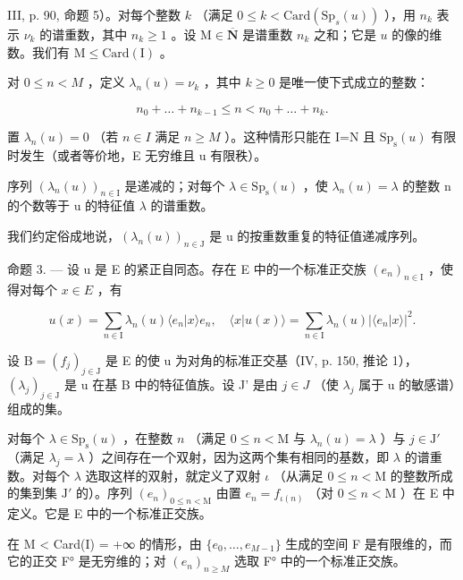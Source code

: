 III, p. 90, 命题 5）。对每个整数 \(k\) （满足 \(0 \leqslant k < \text{Card}(\text{Sp}_s(u))\) ），用 \(n_k\) 表示 \(\nu_k\) 的谱重数，其中 \(n_k \geqslant 1\) 。设 \(\text{M} \in \overline{\mathbf{N}}\) 是谱重数 \(n_k\) 之和；它是 \(u\) 的像的维数。我们有 \(\text{M} \leqslant \text{Card}(\text{I})\) 。

对 \(0 \leqslant n < M\) ，定义 \(\lambda_n(u) = \nu_k\) ，其中 \(k \geqslant 0\) 是唯一使下式成立的整数：

\[
n _ {0} + \dots + n _ {k - 1} \leqslant n <   n _ {0} + \dots + n _ {k}.
\]

置 \(\lambda_{n}(u)=0\) （若 \(n\in I\) 满足 \(n\geqslant M\) ）。这种情形只能在 I=N 且 \(\mathrm{Sp}_{\mathrm{s}}(u)\) 有限时发生（或者等价地，E 无穷维且 u 有限秩）。

序列 \((\lambda_{n}(u))_{n\in\mathrm{I}}\) 是递减的；对每个 \(\lambda\in\mathrm{Sp}_{\mathrm{s}}(u)\) ，使 \(\lambda_{n}(u)=\lambda\) 的整数 n 的个数等于 u 的特征值 \(\lambda\) 的谱重数。

我们约定俗成地说，\((\lambda_{n}(u))_{n\in\mathrm{J}}\) 是 u 的按重数重复的特征值递减序列。

命题 3. --- 设 u 是 E 的紧正自同态。存在 E 中的一个标准正交族 \((e_{n})_{n\in\mathrm{I}}\) ，使得对每个 \(x\in E\) ，有

\[
u (x) = \sum_ {n \in \mathrm{I}} \lambda_ {n} (u) \langle e _ {n} | x \rangle e _ {n}, \quad \langle x | u (x) \rangle = \sum_ {n \in \mathrm{I}} \lambda_ {n} (u) | \langle e _ {n} | x \rangle | ^ {2}.
\]

设 \(\mathrm{B} = (f_{j})_{j \in \mathrm{J}}\) 是 E 的使 u 为对角的标准正交基（IV, p. 150, 推论 1），\((\lambda_{j})_{j \in \mathrm{J}}\) 是 u 在基 B 中的特征值族。设 J' 是由 \(j \in J\) （使 \(\lambda_{j}\) 属于 u 的敏感谱）组成的集。

对每个 \(\lambda \in \mathrm{Sp}_{\mathrm{s}}(u)\) ，在整数 \(n\) （满足 \(0 \leqslant n < \mathrm{M}\) 与 \(\lambda_{n}(u) = \lambda\) ）与 \(j \in \mathrm{J}'\) （满足 \(\lambda_{j} = \lambda\) ）之间存在一个双射，因为这两个集有相同的基数，即 \(\lambda\) 的谱重数。对每个 \(\lambda\) 选取这样的双射，就定义了双射 \(\iota\) （从满足 \(0 \leqslant n < \mathrm{M}\) 的整数所成的集到集 \(\mathrm{J}'\) 的）。序列 \((e_n)_{0 \leqslant n < \mathrm{M}}\) 由置 \(e_n = f_{\iota(n)}\) （对 \(0 \leqslant n < \mathrm{M}\) ）在 E 中定义。它是 E 中的一个标准正交族。

在 M \textless{} Card(I) = +∞ 的情形，由 \(\{e_{0},\ldots,e_{M-1}\}\) 生成的空间 F 是有限维的，而它的正交 F° 是无穷维的；对 \((e_{n})_{n\geqslant M}\) 选取 F° 中的一个标准正交族。

